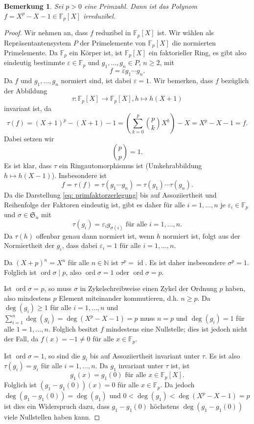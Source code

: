 \documentclass[a4paper,10pt]{article}
\newcounter{satze}
\newtheorem{bem}[satze]{Bemerkung}
\theoremstyle{definition}
\newcommand{\N}{\mathbb{N}}
\newcommand{\mf}[1]{\mathfrak{#1}}
\newcommand{\F}{\mathbb{F}}
\newcommand{\id}{\operatorname{id}}
\newcommand{\ord}{\operatorname{ord}}
\begin{document}
\begin{bem}
 Sei $p > 0$ eine Primzahl. Dann ist das Polynom $f = X^p -X -1 \in \F_p[X]$ irreduzibel.
\end{bem}
\begin{proof}
 Wir nehmen an, dass $f$ reduzibel in $\F_p[X]$ ist. Wir wählen als Repräsentantensystem $P$ der Primelemente von $\F_p[X]$ die normierten Primelemente. Da $\F_p$ ein Körper ist, ist $\F_p[X]$ ein faktorieller Ring, es gibt also eindeutig bestimmte $\varepsilon \in \F_p$ und $g_1, \ldots, g_n \in P$, $n \geq 2$, mit
 \begin{equation}\label{eq: primfaktorzerlegung}
  f = \varepsilon g_1 \cdots g_n.
 \end{equation}
 Da $f$ und $g_1, \ldots, g_n$ normiert sind, ist dabei $\varepsilon = 1$.
 Wir bemerken, dass $f$ bezüglich der Abbildung
 \[
  \tau : \F_p[X] \rightarrow \F_p[X], h \mapsto h(X+1)
 \]
 invariant ist, da
 \[
  \tau(f)
  = (X+1)^p -(X+1) -1
  = \left( \sum_{k=0}^p \binom{p}{k} X^k \right) -X
  = X^p -X -1
  = f.
 \]
 Dabei setzen wir
 \[
  \binom{p}{p} = 1.
 \]
 Es ist klar, dass $\tau$ ein Ringautomorphismus ist (Umkehrabbildung $h \mapsto h(X-1)$). Insbesondere ist
 \[
  f = \tau(f) = \tau(g_1 \cdots g_n) = \tau(g_1) \cdots \tau(g_n).
 \]
 Da die Darstellung \eqref{eq: primfaktorzerlegung} bis auf Assoziiertheit und Reihenfolge der Faktoren eindeutig ist, gibt es daher für alle $i=1,\ldots,n$ je $\varepsilon_i \in \F_p$ und $\sigma \in \mf{S}_n$ mit
 \[
  \tau(g_i) = \varepsilon_i g_{\sigma(i)} \text{ für alle } i=1,\ldots,n.
 \]
 Da $\tau(h)$ offenbar genau dann normiert ist, wenn $h$ normiert ist, folgt aus der Normiertheit der $g_i$, dass dabei $\varepsilon_i = 1$ für alle $i=1,\ldots,n$.
 
 Da $(X+p)^n = X^n$ für alle $n \in \N$ ist $\tau^p = \id$. Es ist daher insbesondere $\sigma^p = 1$. Folglich ist $\ord \sigma \mid p$, also $\ord \sigma = 1$ oder $\ord \sigma = p$.
 
 Ist $\ord \sigma = p$, so muss $\sigma$ in Zykelschreibweise einen Zykel der Ordnung $p$ haben, also mindestens $p$ Element miteinander kommutieren, d.h. $n \geq p$. Da $\deg(g_i) \geq 1$ für alle $i=1,\ldots,n$ und $\sum_{i=1}^n \deg(g_i) = \deg(X^p-X-1) = p$ muss $n=p$ und $\deg(g_i) = 1$ für alle $1=1,\ldots,n$. Folglich besitzt $f$ mindestens eine Nullstelle; dies ist jedoch nicht der Fall, da $f(x) = -1 \neq 0$ für alle $x \in \F_p$.
 
 Ist $\ord \sigma = 1$, so sind die $g_i$ bis auf Assoziiertheit invariant unter $\tau$. Es ist also $\tau(g_i) = g_i$ für alle $i=1,\ldots,n$. Da $g_1$ invariant unter $\tau$ ist, ist
 \[
  g_1(x) = g_1(0) \text{ für alle } x \in \F_p[X].
 \]
 Folglich ist $(g_1-g_1(0))(x) = 0$ für alle $x \in \F_p$. Da jedoch $\deg(g_1-g_1(0)) = \deg(g_1)$ und $0 < \deg(g_1) < \deg(X^p-X-1)=p$ ist dies ein Widerspruch dazu, dass $g_1-g_1(0)$ höchstens $\deg(g_1-g_1(0))$ viele Nullstellen haben kann.
\end{proof}
\end{document}
